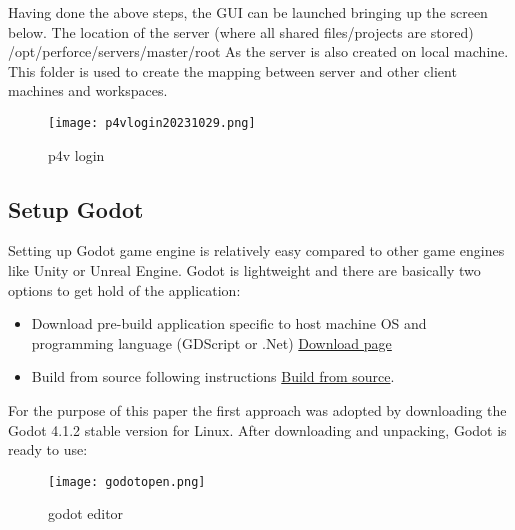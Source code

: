 Having done the above steps, the GUI can be launched bringing up the screen below. The location of the server (where
all shared files/projects are stored) \colorbox{blue!30}{/opt/perforce/servers/master/root} 
As the server is also created on local machine. This folder is used to create the mapping between server and other 
client machines and workspaces.
\begin{figure}[H]
    \centering
    \texttt{[image: p4vlogin20231029.png]}
      \caption{p4v login}
      \label{fig:p4v login}
\end{figure}

\subsection{Setup Godot}
Setting up Godot game engine is relatively easy compared to other game engines like Unity\textsuperscript{\texttrademark}
or Unreal Engine\textsuperscript{\texttrademark}. Godot is lightweight and there are basically two options to get hold
of the application:
\begin{itemize}
    \item Download pre-build application specific to host machine OS and programming language (GDScript or .Net)
    \href{https://godotengine.org/download/linux/}{\color{blue}Download page}
    \item Build from source following instructions 
    \href{https://docs.godotengine.org/en/stable/contributing/development/compiling/index.html}{\color{blue}Build from source}.
\end{itemize}
For the purpose of this paper the first approach was adopted by downloading the Godot 4.1.2 stable version for Linux.
After downloading and unpacking, Godot is ready to use:
\begin{figure}[H]
    \centering
    \texttt{[image: godotopen.png]}
      \caption{godot editor}
      \label{fig:godot}
\end{figure}